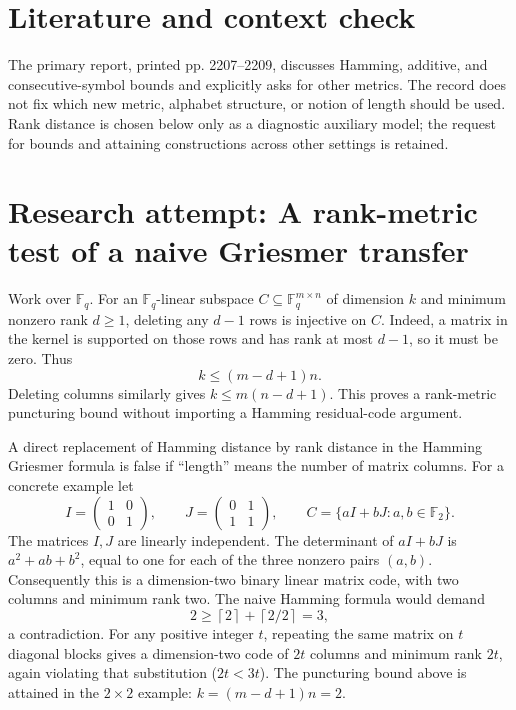 \documentclass[11pt]{article}
\begin{document}
\section{Literature and context check}
The primary report, printed pp. 2207--2209, discusses Hamming, additive, and consecutive-symbol bounds and explicitly asks for other metrics. The record does not fix which new metric, alphabet structure, or notion of length should be used. Rank distance is chosen below only as a diagnostic auxiliary model; the request for bounds and attaining constructions across other settings is retained.
\section{Research attempt: A rank-metric test of a naive Griesmer transfer}

Work over $\mathbb F_q$. For an $\mathbb F_q$-linear subspace $C\subseteq\mathbb F_q^{m\times n}$ of dimension $k$ and minimum nonzero rank $d\geq1$, deleting any $d-1$ rows is injective on $C$. Indeed, a matrix in the kernel is supported on those rows and has rank at most $d-1$, so it must be zero. Thus
\[
k\leq (m-d+1)n.
\]
Deleting columns similarly gives $k\leq m(n-d+1)$. This proves a rank-metric puncturing bound without importing a Hamming residual-code argument.

A direct replacement of Hamming distance by rank distance in the Hamming Griesmer formula is false if ``length'' means the number of matrix columns. For a concrete example let
\[
I=\begin{pmatrix}1&0\\0&1\end{pmatrix},\qquad
J=\begin{pmatrix}0&1\\1&1\end{pmatrix},\qquad
C=\{aI+bJ:a,b\in\mathbb F_2\}.
\]
The matrices $I,J$ are linearly independent. The determinant of $aI+bJ$ is $a^2+ab+b^2$, equal to one for each of the three nonzero pairs $(a,b)$. Consequently this is a dimension-two binary linear matrix code, with two columns and minimum rank two. The naive Hamming formula would demand
\[
2\geq \left\lceil2\right\rceil+\left\lceil2/2\right\rceil=3,
\]
a contradiction. For any positive integer $t$, repeating the same matrix on $t$ diagonal blocks gives a dimension-two code of $2t$ columns and minimum rank $2t$, again violating that substitution ($2t<3t$). The puncturing bound above is attained in the $2\times2$ example: $k=(m-d+1)n=2$.
\end{document}
